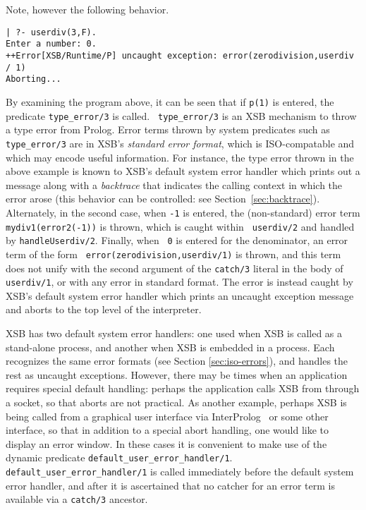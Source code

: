\noindent
Note, however the following behavior.

\begin{small}
\begin{verbatim}
| ?- userdiv(3,F).
Enter a number: 0.
++Error[XSB/Runtime/P] uncaught exception: error(zerodivision,userdiv / 1)
Aborting...
\end{verbatim}
\end{small}

\noindent
By examining the program above, it can be seen that if {\tt p(1)} is
entered, the predicate {\tt type\_error/3} is called.  {\tt
  type\_error/3} is an XSB mechanism to throw a type error from
Prolog.  Error terms thrown by system predicates such as {\tt
  type\_error/3} are in XSB's {\em standard error format}, which is
ISO-compatable and which may encode useful information.  For instance,
the type error thrown in the above example is known to XSB's default
system error handler which prints out a message along with a {\em
  backtrace} that indicates the calling context in which the error
arose (this behavior can be controlled: see
Section~\ref{sec:backtrace}).  Alternately, in the second case, when
{\tt -1} is entered, the (non-standard) error term {\tt
  mydiv1(error2(-1))} is thrown, which is caught within {\tt
  userdiv/2} and handled by {\tt handleUserdiv/2}.  Finally, when {\tt
  0} is entered for the denominator, an error term of the form {\tt
  error(zerodivision,userdiv/1)} is thrown, and this term does not
unify with the second argument of the {\tt catch/3} literal in the
body of {\tt userdiv/1}, or with any error in standard format.  The
error is instead caught by XSB's default system error handler which
prints an uncaught exception message and aborts to the top level of
the interpreter.

XSB has two default system error handlers: one used when XSB is called
as a stand-alone process, and another when XSB is embedded in a
process.  Each recognizes the same error formats (see Section
\ref{sec:iso-errors}), and handles the rest as uncaught exceptions.
However, there may be times when an application requires special
default handling: perhaps the application calls XSB from through a
socket, so that aborts are not practical.  As another example, perhaps
XSB is being called from a graphical user interface via
InterProlog~\cite{Cale01} or some other interface, so that in addition
to a special abort handling, one would like to display an error
window.  In these cases it is convenient to make use of the dynamic
predicate {\tt default\_user\_error\_handler/1}.  {\tt
  default\_user\_error\_handler/1} is called immediately before the
default system error handler, and after it is ascertained that no
catcher for an error term is available via a {\tt catch/3} ancestor.

